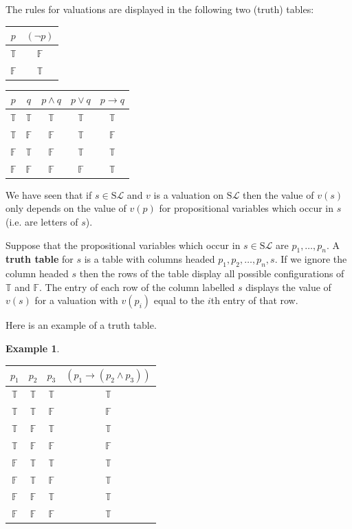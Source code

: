 \documentclass[11pt]{article}
\newcommand{\PF}{\mathrm{S}}
\newtheorem{example}[theorem]{Example}
\newcommand{\mcal}[1]{\mathcal{#1}}
\newcommand{\F}{\mathbb{F}}
\newcommand{\T}{\mathbb{T}}
\begin{document}
The rules for valuations are displayed in the following two (truth) tables:

\begin{center}
\begin{tabular}{|c||c|}
  \hline
  $p$ & $(\neg p)$ \\\hline
  $\T$ & $\F$ \\
$\F$ & $\T$ \\
  \hline
\end{tabular}
\qquad \qquad
\begin{tabular}{|c|c||c|c|c|}
  \hline
  $p$ & $q$ & $p\wedge q$ & $p\vee q$ & $p\rightarrow q$ \\\hline
  $\T$ & $\T$ & $\T$ & $\T$ & $\T$ \\
  $\T$ & $\F$ & $\F$ & $\T$ & $\F$ \\
  $\F$ & $\T$ &  $\F$ & $\T$ & $\T$ \\
$\F$ & $\F$ &  $\F$ & $\F$ & $\T$ \\
  \hline
\end{tabular}
\end{center}

We have seen that if $s\in \PF\mcal{L}$ and $v$ is a valuation on $\PF\mcal{L}$ then the value of $v(s)$ only depends on the value of $v(p)$ for propositional variables which occur in $s$ (i.e. are letters of $s$).

Suppose that the propositional variables which occur in $s\in\PF\mcal{L}$ are $p_1,\ldots,p_n$. A \textbf{truth table} for $s$ is a table with columns headed $p_1, p_2,\ldots,p_n, s$. If we ignore the column headed $s$ then the rows of the table display all possible configurations of $\T$ and $\F$. The entry of each row of the column labelled $s$ displays the value of $v(s)$ for a valuation with $v(p_i)$ equal to the $i$th entry of that row.

Here is an example of a truth table.

\begin{example}
\
\smallskip

\begin{tabular}{|c|c|c||c|}
  \hline
  $p_1$ & $p_2$ & $p_3$ &  $(p_1\rightarrow (p_2\wedge p_3))$ \\\hline
  $\T$ & $\T$ & $\T$ & $\T$ \\
  $\T$ & $\T$ & $\F$ & $\F$ \\
  $\T$ & $\F$ & $\T$ & $\T$ \\
  $\T$ & $\F$ & $\F$ & $\F$ \\
  $\F$ & $\T$ & $\T$ & $\T$ \\
  $\F$ & $\T$ & $\F$ & $\T$ \\
  $\F$ & $\F$ & $\T$ & $\T$ \\
  $\F$ & $\F$ & $\F$ & $\T$ \\
  \hline
\end{tabular}


\end{example}
\end{document}

